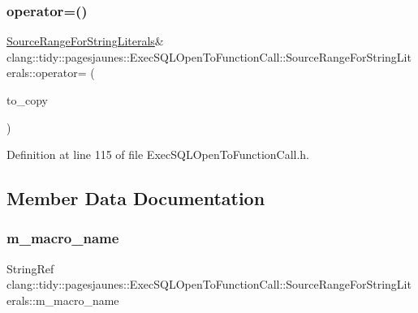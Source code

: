 \subsubsection{\texorpdfstring{operator=()}{operator=()}\hspace{0.1cm}{\footnotesize\ttfamily [2/2]}}
{\footnotesize\ttfamily \hyperlink{classclang_1_1tidy_1_1pagesjaunes_1_1_exec_s_q_l_open_to_function_call_1_1_source_range_for_string_literals}{Source\+Range\+For\+String\+Literals}\& clang\+::tidy\+::pagesjaunes\+::\+Exec\+S\+Q\+L\+Open\+To\+Function\+Call\+::\+Source\+Range\+For\+String\+Literals\+::operator= (\begin{DoxyParamCaption}\item[{\hyperlink{classclang_1_1tidy_1_1pagesjaunes_1_1_exec_s_q_l_open_to_function_call_1_1_source_range_for_string_literals}{Source\+Range\+For\+String\+Literals} \&}]{to\+\_\+copy }\end{DoxyParamCaption})\hspace{0.3cm}{\ttfamily [inline]}}



Definition at line 115 of file Exec\+S\+Q\+L\+Open\+To\+Function\+Call.\+h.



\subsection{Member Data Documentation}
\mbox{\label{classclang_1_1tidy_1_1pagesjaunes_1_1_exec_s_q_l_open_to_function_call_1_1_source_range_for_string_literals_a37bd1a32e4df4306ae99daf3bb3743d4}} 
\subsubsection{\texorpdfstring{m\+\_\+macro\+\_\+name}{m\_macro\_name}}
{\footnotesize\ttfamily String\+Ref clang\+::tidy\+::pagesjaunes\+::\+Exec\+S\+Q\+L\+Open\+To\+Function\+Call\+::\+Source\+Range\+For\+String\+Literals\+::m\+\_\+macro\+\_\+name}



